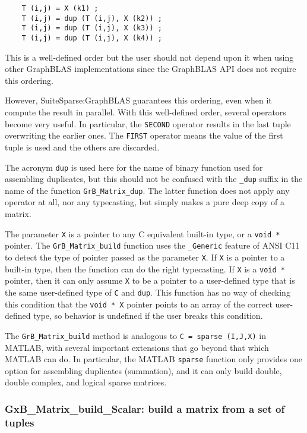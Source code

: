 \documentclass[12pt]{article}
\begin{document}
    {\footnotesize
    \begin{verbatim}
    T (i,j) = X (k1) ;
    T (i,j) = dup (T (i,j), X (k2)) ;
    T (i,j) = dup (T (i,j), X (k3)) ;
    T (i,j) = dup (T (i,j), X (k4)) ; \end{verbatim}}

This is a well-defined order but the user should not depend upon it when using
other GraphBLAS implementations since the GraphBLAS API does not
require this ordering.

However, SuiteSparse:GraphBLAS guarantees this ordering, even when it compute
the result in parallel.  With this well-defined order, several operators become
very useful.  In particular, the \verb'SECOND' operator results in the last
tuple overwriting the earlier ones.  The \verb'FIRST' operator means the value
of the first tuple is used and the others are discarded.

The acronym \verb'dup' is used here for the name of binary function used for
assembling duplicates, but this should not be confused with the \verb'_dup'
suffix in the name of the function \verb'GrB_Matrix_dup'.  The latter function
does not apply any operator at all, nor any typecasting, but simply makes a
pure deep copy of a matrix.

The parameter \verb'X' is a pointer to any C equivalent built-in type, or a
\verb'void *' pointer.  The \verb'GrB_Matrix_build' function uses the
\verb'_Generic' feature of ANSI C11 to detect the type of pointer passed as the
parameter \verb'X'.  If \verb'X' is a pointer to a built-in type, then the
function can do the right typecasting.  If \verb'X' is a \verb'void *' pointer,
then it can only assume \verb'X' to be a pointer to a user-defined type that is
the same user-defined type of \verb'C' and \verb'dup'.  This function has no
way of checking this condition that the \verb'void * X' pointer points to an
array of the correct user-defined type, so behavior is undefined if the user
breaks this condition.

The \verb'GrB_Matrix_build' method is analogous to \verb'C = sparse (I,J,X)' in
MATLAB, with several important extensions that go beyond that which MATLAB can
do.  In particular, the MATLAB \verb'sparse' function only provides one option
for assembling duplicates (summation), and it can only build double, double
complex, and logical sparse matrices.

\subsubsection{{\sf GxB\_Matrix\_build\_Scalar:} build a matrix from a set of tuples}
\label{matrix_build_Scalar}
\end{document}

